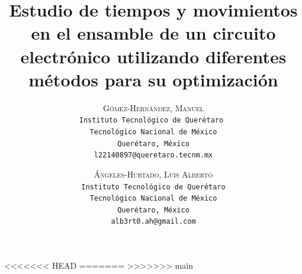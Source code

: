<<<<<<< HEAD
=======
>>>>>>> main
    \lfoot{ \thepage}
    
    \setlength{\droptitle}{-5\baselineskip} %
    \title{\textbf{Estudio de tiempos y movimientos en el ensamble de un circuito electrónico utilizando diferentes métodos para su optimización }} %
    
     \author{ 
     \textsc{Gómez-Hernández, Manuel}\\ 
     \texttt{Instituto Tecnológico de Querétaro } \\ 
     \texttt{Tecnológico Nacional de México} \\ 
     \texttt{Querétaro, México}\\ 
     \texttt{l22140897@queretaro.tecnm.mx} 
     \and 
     \textsc{Ángeles-Hurtado, Luis Alberto}\\ 
     \texttt{ Instituto Tecnológico de Querétaro } \\ 
     \texttt{ Tecnológico Nacional de México } \\ 
     \texttt{Querétaro, México}\\ 
     \texttt{alb3rt0.ah@gmail.com} 
    }
    
